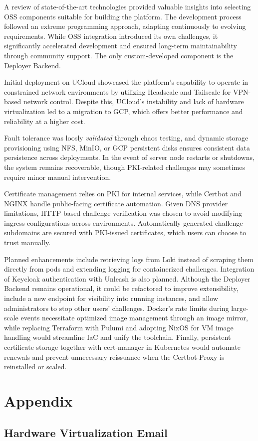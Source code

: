 A review of state-of-the-art technologies provided valuable insights into selecting OSS components suitable for building the platform. The development process followed an extreme programming approach, adapting continuously to evolving requirements. While OSS integration introduced its own challenges, it significantly accelerated development and ensured long-term maintainability through community support. The only custom-developed component is the Deployer Backend.

Initial deployment on UCloud showcased the platform's capability to operate in constrained network environments by utilizing Headscale and Tailscale for VPN-based network control. Despite this, UCloud's instability and lack of hardware virtualization led to a migration to GCP, which offers better performance and reliability at a higher cost.

Fault tolerance was loosly \textit{validated} through chaos testing, and dynamic storage provisioning using NFS, MinIO, or GCP persistent disks ensures consistent data persistence across deployments. In the event of server node restarts or shutdowns, the system remains recoverable, though PKI-related challenges may sometimes require minor manual intervention.

Certificate management relies on PKI for internal services, while Certbot and NGINX handle public-facing certificate automation. Given DNS provider limitations, HTTP-based challenge verification was chosen to avoid modifying ingress configurations across environments. Automatically generated challenge subdomains are secured with PKI-issued certificates, which users can choose to trust manually.

Planned enhancements include retrieving logs from Loki instead of scraping them directly from pods and extending logging for containerized challenges. Integration of Keycloak authentication with Unleash is also planned. Although the Deployer Backend remains operational, it could be refactored to improve extensibility, include a new endpoint for visibility into running instances, and allow administrators to stop other users' challenges. Docker's rate limits during large-scale events necessitate optimized image management through an image mirror, while replacing Terraform with Pulumi and adopting NixOS for VM image handling would streamline IaC and unify the toolchain. Finally, persistent certificate storage together with cert-manager in Kubernetes would automate renewals and prevent unnecessary reissuance when the Certbot-Proxy is reinstalled or scaled.

\cleardoublepage
{}
{}
\printbibliography

\chapter*{Appendix}
\section*{Hardware Virtualization Email}\label{sec:hardware_virtualization_email}

